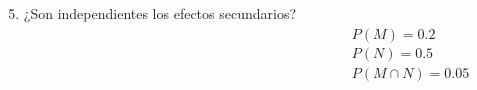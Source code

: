 \documentclass[aspectratio=149,10pt,xcolor=dvipsnames,t]{beamer}
\begin{document}
\begin{frame}
	\begin{columns}
		\begin{column}[T]{0.75\textwidth}
			\begin{enumerate}
  \setcounter{enumi}{4}
				\item ¿Son independientes los efectos secundarios?
			\end{enumerate}		
		\end{column}
		\begin{column}[T]{0.25\textwidth}
			\\
			$P(M)=0.2$\\
			$P(N)=0.5$\\
			$P(M\cap N)=0.05$
		\end{column}
	\end{columns}
\end{frame}
	
\end{document}
